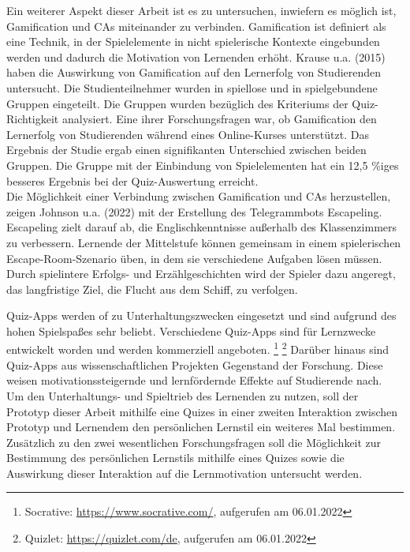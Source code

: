 Ein weiterer Aspekt dieser Arbeit ist es zu untersuchen, inwiefern es möglich ist, Gamification und CAs miteinander zu verbinden.
Gamification ist definiert als eine Technik,
in der Spielelemente in nicht spielerische Kontexte eingebunden werden
und dadurch die Motivation von Lernenden erhöht. \parencite[4]{Arai.2014} \parencite[1]{Sailer.2013}
Krause u.a. (2015) haben die Auswirkung von Gamification auf den Lernerfolg 
von Studierenden untersucht. Die Studienteilnehmer wurden in spiellose und in
spielgebundene Gruppen eingeteilt. Die Gruppen wurden bezüglich
des Kriteriums der Quiz-Richtigkeit analysiert. Eine ihrer Forschungsfragen war, 
ob Gamification den Lernerfolg von Studierenden während eines Online-Kurses 
unterstützt. Das Ergebnis der Studie ergab einen signifikanten Unterschied zwischen
beiden Gruppen. Die Gruppe mit der Einbindung von Spielelementen hat ein 12,5 \%iges 
besseres Ergebnis bei der Quiz-Auswertung erreicht. \parencite[3 ff.]{Krause.2015}\\
Die Möglichkeit einer Verbindung zwischen Gamification und CAs herzustellen, zeigen Johnson u.a. (2022)
mit der Erstellung des Telegrammbots \glqq Escapeling\grqq{}.
Escapeling zielt darauf ab,
die Englischkenntnisse außerhalb des Klassenzimmers zu verbessern.
Lernende der Mittelstufe können gemeinsam in einem spielerischen
Escape-Room-Szenario üben, in dem sie verschiedene Aufgaben lösen müssen.
Durch spielintere Erfolgs- und Erzählgeschichten wird der Spieler dazu angeregt,
das langfristige Ziel, die Flucht aus dem Schiff, zu verfolgen. \parencite[1]{Johnson.2022}

Quiz-Apps werden of zu Unterhaltungszwecken eingesetzt und sind aufgrund des hohen 
Spielspaßes sehr beliebt. \parencite[487]{Söbke.2015}
Verschiedene Quiz-Apps sind für Lernzwecke entwickelt worden und werden kommerziell angeboten. \footnote{Socrative: \url{https://www.socrative.com/}, aufgerufen am 06.01.2022} \footnote{Quizlet: \url{https://quizlet.com/de}, aufgerufen am 06.01.2022}
Darüber hinaus sind Quiz-Apps aus wissenschaftlichen Projekten Gegenstand der Forschung. Diese
weisen motivationssteigernde und lernfördernde Effekte auf Studierende nach. \parencite[1]{Pechenkina.2017} \parencite[2]{Roediger.2011} \\
Um den Unterhaltungs- und Spieltrieb des Lernenden zu nutzen, soll der Prototyp dieser Arbeit mithilfe eine Quizes
in einer zweiten Interaktion zwischen Prototyp und Lernendem den persönlichen Lernstil ein weiteres Mal
bestimmen. Zusätzlich zu den zwei wesentlichen Forschungsfragen soll die
Möglichkeit zur Bestimmung des persönlichen Lernstils mithilfe eines Quizes sowie die Auswirkung 
dieser Interaktion auf die Lernmotivation untersucht werden. 

